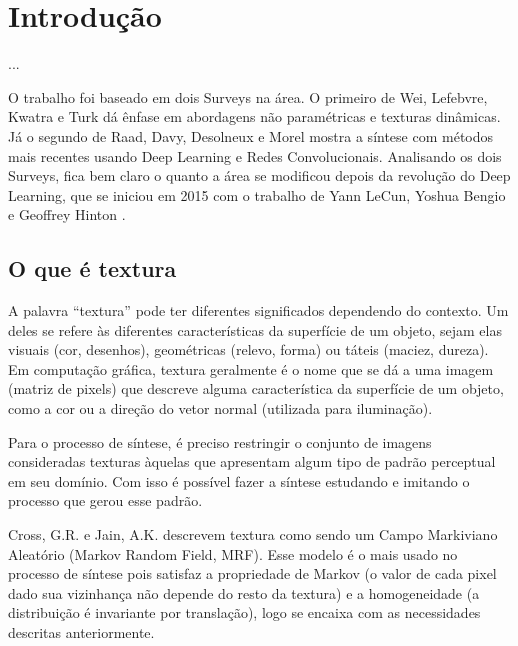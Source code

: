 \chapter{Introdução}

...





O trabalho foi baseado em dois Surveys
na área. O primeiro de Wei, Lefebvre, Kwatra
e Turk \cite{Wei2009} dá ênfase em
abordagens não paramétricas e texturas
dinâmicas. Já o segundo de Raad, Davy, 
Desolneux e Morel \cite{Raad2018} mostra
a síntese com métodos mais recentes
usando Deep Learning e Redes Convolucionais.
Analisando os dois Surveys, fica bem claro o 
quanto a área se modificou depois da
revolução do Deep Learning, que se iniciou
em 2015 com o trabalho de Yann LeCun, 
Yoshua Bengio e Geoffrey Hinton \cite{LeCun2015}.

\section{O que é textura}



A palavra ``textura'' pode ter diferentes significados
dependendo do contexto.
Um deles se refere às
diferentes características da superfície de um objeto,
sejam elas visuais (cor, desenhos), geométricas (relevo,
forma) ou táteis (maciez, dureza). 
Em computação gráfica, textura geralmente é
o nome que se dá a uma imagem (matriz de pixels)
que descreve alguma
característica da superfície de um objeto,
como a cor ou a direção do vetor normal (utilizada
para iluminação).


Para o processo de síntese, é preciso restringir o
conjunto de imagens consideradas texturas àquelas
que apresentam algum tipo de padrão perceptual
em seu domínio. Com isso é possível fazer a síntese
estudando e imitando o processo que gerou esse padrão.


Cross, G.R. e Jain, A.K. \cite{Cross1983} descrevem
textura como sendo um Campo Markiviano Aleatório
(Markov Random Field, MRF). Esse modelo é o mais
usado no processo de síntese pois satisfaz a propriedade
de Markov (o valor de cada pixel dado sua vizinhança não
depende do resto da textura) e a homogeneidade (a
distribuição é invariante por translação), logo
se encaixa com as necessidades descritas anteriormente.

